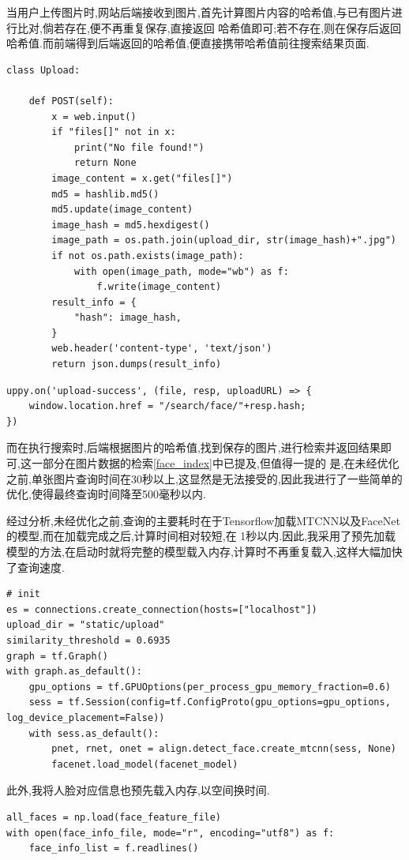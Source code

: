 \documentclass[a4paper]{article}
\begin{document}
当用户上传图片时,网站后端接收到图片,首先计算图片内容的哈希值,与已有图片进行比对,倘若存在,便不再重复保存,直接返回
哈希值即可;若不存在,则在保存后返回哈希值.而前端得到后端返回的哈希值,便直接携带哈希值前往搜索结果页面.
\begin{verbatim}
class Upload:

    def POST(self):
        x = web.input()
        if "files[]" not in x:
            print("No file found!")
            return None
        image_content = x.get("files[]")
        md5 = hashlib.md5()
        md5.update(image_content)
        image_hash = md5.hexdigest()
        image_path = os.path.join(upload_dir, str(image_hash)+".jpg")
        if not os.path.exists(image_path):
            with open(image_path, mode="wb") as f:
                f.write(image_content)
        result_info = {
            "hash": image_hash,
        }
        web.header('content-type', 'text/json')
        return json.dumps(result_info)
\end{verbatim}

\begin{verbatim}
uppy.on('upload-success', (file, resp, uploadURL) => {
    window.location.href = "/search/face/"+resp.hash;  
})
\end{verbatim}

而在执行搜索时,后端根据图片的哈希值,找到保存的图片,进行检索并返回结果即可,这一部分在图片数据的检索\ref{face_index}中已提及,但值得一提的
是,在未经优化之前,单张图片查询时间在30秒以上,这显然是无法接受的,因此我进行了一些简单的优化,使得最终查询时间降至500毫秒以内.

经过分析,未经优化之前,查询的主要耗时在于Tensorflow加载MTCNN以及FaceNet的模型,而在加载完成之后,计算时间相对较短,在
1秒以内.因此,我采用了预先加载模型的方法,在启动时就将完整的模型载入内存,计算时不再重复载入,这样大幅加快了查询速度.
\begin{verbatim}
# init
es = connections.create_connection(hosts=["localhost"])
upload_dir = "static/upload"
similarity_threshold = 0.6935
graph = tf.Graph()
with graph.as_default():
    gpu_options = tf.GPUOptions(per_process_gpu_memory_fraction=0.6)
    sess = tf.Session(config=tf.ConfigProto(gpu_options=gpu_options, log_device_placement=False))
    with sess.as_default():
        pnet, rnet, onet = align.detect_face.create_mtcnn(sess, None)
        facenet.load_model(facenet_model)
\end{verbatim}

此外,我将人脸对应信息也预先载入内存,以空间换时间.
\begin{verbatim}
all_faces = np.load(face_feature_file)
with open(face_info_file, mode="r", encoding="utf8") as f:
    face_info_list = f.readlines()
\end{verbatim}
\end{document}
